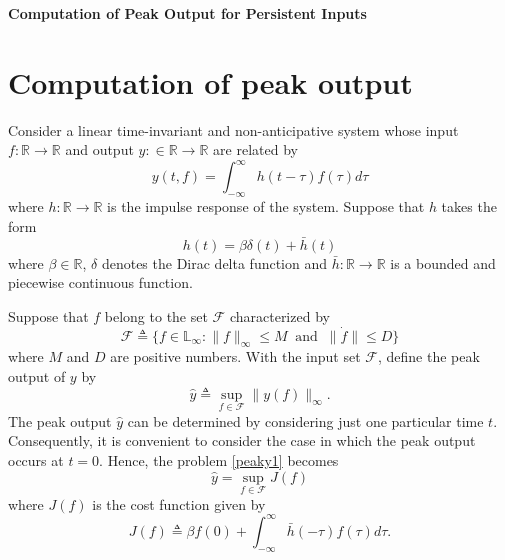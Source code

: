 \documentclass[a4paper,11pt]{article}
\theoremstyle{definition}
\begin{document}
\begin{center}
{\huge \bf Computation of Peak Output for Persistent Inputs} 
\end{center}
\section{Computation of peak output}
Consider a linear time-invariant and non-anticipative system whose input  $f:\mathbb{R}\rightarrow\mathbb{R}$ 
    and output $y:\in\mathbb{R}\rightarrow\mathbb{R}$ are related by
\begin{equation}\label{eq:sys}
    y(t,f) = \int_{-\infty}^\infty h(t-\tau)f(\tau)d\tau
\end{equation}
where $h:\mathbb{R}\rightarrow\mathbb{R}$ is the impulse response of the system.
Suppose that $h$ takes the form
\[
    h(t) = \beta\delta(t) + \bar{h}(t)
\]
where $\beta\in\mathbb{R}$, $\delta$ denotes the Dirac delta function and 
    $\bar{h} :\mathbb{R}\rightarrow\mathbb{R}$ 
    is a bounded and piecewise continuous function.
    

Suppose that $f$ belong to the set $\mathcal{F}$ characterized by
\begin{equation}\label{eq:F}
    \mathcal{F}\triangleq \{f\in\mathbb{L}_\infty: \|f\|_\infty\le M\;\; \text{and}\;\; \|\dot{f}\|\le D\}
\end{equation}
    where $M$ and $D$ are positive numbers.
With the input set $\mathcal{F}$, define the peak output of $y$ by
\begin{equation}\label{peaky1}
    \hat{y}\triangleq \sup_{f\in\mathcal{F}}\|y(f)\|_\infty.
\end{equation}
The peak output $\hat{y}$ can be determined by considering just one particular time $t$. 
Consequently, it is convenient to consider the case in which the peak output occurs at $t=0$.
Hence, the problem \eqref{peaky1} becomes
\begin{equation}\label{peaky2}
    \hat{y} = \sup_{f\in\mathcal{F}} J(f) 
\end{equation}
where $J(f)$ is the cost function given by
\begin{equation}\label{eq:int}
    J(f)\triangleq \beta f(0) + \int_{-\infty}^\infty \bar{h}(-\tau)f(\tau)d\tau.
\end{equation}
\end{document}
